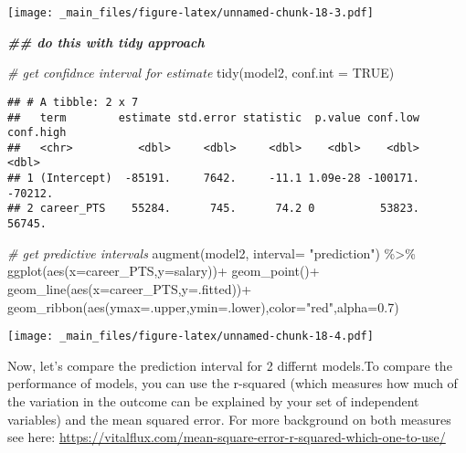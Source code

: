 \documentclass[
]{book}
\newenvironment{Shaded}{\begin{snugshade}}{\end{snugshade}}
\newcommand{\AttributeTok}[1]{\textcolor[rgb]{0.77,0.63,0.00}{#1}}
\newcommand{\AttributeTok}[1]{\textcolor[rgb]{0.13,0.29,0.53}{#1}}
\newcommand{\CommentTok}[1]{\textcolor[rgb]{0.56,0.35,0.01}{\textit{#1}}}
\newcommand{\ConstantTok}[1]{\textcolor[rgb]{0.00,0.00,0.00}{#1}}
\newcommand{\ConstantTok}[1]{\textcolor[rgb]{0.56,0.35,0.01}{#1}}
\newcommand{\DocumentationTok}[1]{\textcolor[rgb]{0.56,0.35,0.01}{\textbf{\textit{#1}}}}
\newcommand{\FloatTok}[1]{\textcolor[rgb]{0.00,0.00,0.81}{#1}}
\newcommand{\FunctionTok}[1]{\textcolor[rgb]{0.00,0.00,0.00}{#1}}
\newcommand{\FunctionTok}[1]{\textcolor[rgb]{0.13,0.29,0.53}{\textbf{#1}}}
\newcommand{\NormalTok}[1]{#1}
\newcommand{\SpecialCharTok}[1]{\textcolor[rgb]{0.00,0.00,0.00}{#1}}
\newcommand{\SpecialCharTok}[1]{\textcolor[rgb]{0.81,0.36,0.00}{\textbf{#1}}}
\newcommand{\StringTok}[1]{\textcolor[rgb]{0.31,0.60,0.02}{#1}}
\begin{document}
\texttt{[image: \_main\_files/figure-latex/unnamed-chunk-18-3.pdf]}

\begin{Shaded}
\begin{Highlighting}[]
\DocumentationTok{\#\# do this with tidy approach}

\CommentTok{\# get confidnce interval for estimate}
\FunctionTok{tidy}\NormalTok{(model2, }\AttributeTok{conf.int =} \ConstantTok{TRUE}\NormalTok{)}
\end{Highlighting}
\end{Shaded}

\begin{verbatim}
## # A tibble: 2 x 7
##   term        estimate std.error statistic  p.value conf.low conf.high
##   <chr>          <dbl>     <dbl>     <dbl>    <dbl>    <dbl>     <dbl>
## 1 (Intercept)  -85191.     7642.     -11.1 1.09e-28 -100171.   -70212.
## 2 career_PTS    55284.      745.      74.2 0          53823.    56745.
\end{verbatim}

\begin{Shaded}
\begin{Highlighting}[]
\CommentTok{\# get predictive intervals}
\FunctionTok{augment}\NormalTok{(model2, }\AttributeTok{interval=} \StringTok{"prediction"}\NormalTok{) }\SpecialCharTok{\%\textgreater{}\%}
  \FunctionTok{ggplot}\NormalTok{(}\FunctionTok{aes}\NormalTok{(}\AttributeTok{x=}\NormalTok{career\_PTS,}\AttributeTok{y=}\NormalTok{salary))}\SpecialCharTok{+}
  \FunctionTok{geom\_point}\NormalTok{()}\SpecialCharTok{+}
  \FunctionTok{geom\_line}\NormalTok{(}\FunctionTok{aes}\NormalTok{(}\AttributeTok{x=}\NormalTok{career\_PTS,}\AttributeTok{y=}\NormalTok{.fitted))}\SpecialCharTok{+}
  \FunctionTok{geom\_ribbon}\NormalTok{(}\FunctionTok{aes}\NormalTok{(}\AttributeTok{ymax=}\NormalTok{.upper,}\AttributeTok{ymin=}\NormalTok{.lower),}\AttributeTok{color=}\StringTok{"red"}\NormalTok{,}\AttributeTok{alpha=}\FloatTok{0.7}\NormalTok{)}
\end{Highlighting}
\end{Shaded}

\texttt{[image: \_main\_files/figure-latex/unnamed-chunk-18-4.pdf]}

Now, let's compare the prediction interval for 2 differnt models.To compare the performance of models, you can use the r-squared (which measures how much of the variation in the outcome can be explained by your set of independent variables) and the mean squared error. For more background on both measures see here: \url{https://vitalflux.com/mean-square-error-r-squared-which-one-to-use/}
\end{document}
